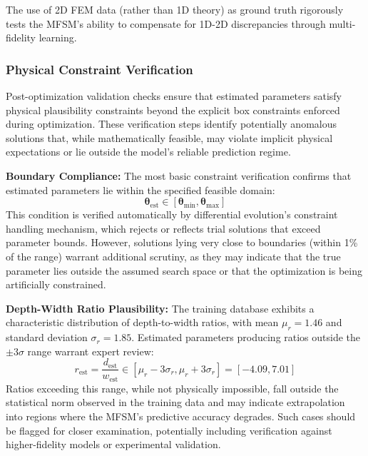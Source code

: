 \documentclass[12pt,a4paper]{report}
\begin{document}
The use of 2D FEM data (rather than 1D theory) as ground truth rigorously tests the MFSM's ability to compensate for 1D-2D discrepancies through multi-fidelity learning.

\subsubsection{Physical Constraint Verification}
Post-optimization validation checks ensure that estimated parameters satisfy physical plausibility constraints beyond the explicit box constraints enforced during optimization. These verification steps identify potentially anomalous solutions that, while mathematically feasible, may violate implicit physical expectations or lie outside the model's reliable prediction regime.

\textbf{Boundary Compliance:} The most basic constraint verification confirms that estimated parameters lie within the specified feasible domain:
\begin{equation}
\boldsymbol{\theta}_{\text{est}} \in [\boldsymbol{\theta}_{\min}, \boldsymbol{\theta}_{\max}]
\end{equation}
This condition is verified automatically by differential evolution's constraint handling mechanism, which rejects or reflects trial solutions that exceed parameter bounds. However, solutions lying very close to boundaries (within 1\% of the range) warrant additional scrutiny, as they may indicate that the true parameter lies outside the assumed search space or that the optimization is being artificially constrained.

\textbf{Depth-Width Ratio Plausibility:} The training database exhibits a characteristic distribution of depth-to-width ratios, with mean $\mu_r = 1.46$ and standard deviation $\sigma_r = 1.85$. Estimated parameters producing ratios outside the $\pm 3\sigma$ range warrant expert review:
\begin{equation}
r_{\text{est}} = \frac{d_{\text{est}}}{w_{\text{est}}} \in [\mu_r - 3\sigma_r, \mu_r + 3\sigma_r] = [-4.09, 7.01]
\end{equation}
Ratios exceeding this range, while not physically impossible, fall outside the statistical norm observed in the training data and may indicate extrapolation into regions where the MFSM's predictive accuracy degrades. Such cases should be flagged for closer examination, potentially including verification against higher-fidelity models or experimental validation.
\end{document}
